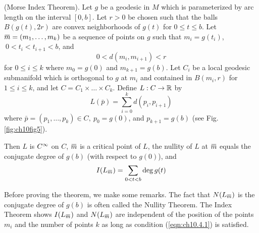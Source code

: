 \documentclass[../main]{subfiles}
\begin{document}
\begin{theorem} \label{thm:ch10.4.2}
(Morse Index Theorem). Let $g$ be a geodesic in $M$ which is parameterized by arc length on the interval $[0,b]$. Let $r>0$ be chosen such that the balls $B(g(t),2r)$ are convex neighborhoods of $g(t)$ for $0\le t\le b$. Let $\xoverline m=(m_1,\ldots,m_k)$ be a sequence of points on $g$ such that $m_i=g(t_i)$,\newline $~0<t_i<t_{i+1}<b$, and
\begin{equation}\tag{10}\label{eqn:ch10.4.1}
0 < d(m_i,m_{i+1}) < r
\end{equation}
for $0\le i\le k$ where $m_0=g(0)$ and $m_{k+1}=g(b)$. Let $C_i$ be a local geodesic submanifold which is orthogonal to $g$ at $m_i$ and contained in $B(m_i,r)$ for \newline $1\le i\le k$, and let $C=C_1\times\ldots\times C_k$. Define $L:C\to\mathbb{R}$ by
\[L(\bar p) = \sum_{i=0}^k d(p_i,p_{i+1})\]
where $\bar p=(p_1,\ldots,p_k)\in C,~p_0=g(0)$, and $p_{k+1}=g(b)$ (see Fig. \ref{fig:ch10fig5}).

Then $L$ is $C^\infty$ on $C$, $\xoverline m$ is a critical point of $L$, the nullity of $L$ at $\xoverline m$ equals the conjugate degree of $g(b)$ (with respect to $g(0)$), and
\[I(L_{\xoverline m}) = \sum_{0<t<b}\deg g(t)\]
\end{theorem}


Before proving the theorem, we make some remarks. The fact that $N(L_{\xoverline m})$ is the conjugate degree of $g(b)$ is often called the Nullity Theorem. The Index Theorem shows $I(L_{\xoverline m})$ and $N(L_{\xoverline m})$ are independent of the position of the points $m_i$ and the number of points $k$ as long as condition (\ref{eqn:ch10.4.1}) is satisfied.
\end{document}
